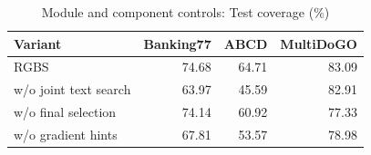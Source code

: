 \begin{table}[!htb]
\caption{Module and component controls: Test coverage (\%)}
\label{tab:rgbs-ablations}
\centering\footnotesize
\setlength{\tabcolsep}{3pt}
\renewcommand{\arraystretch}{1.00}
\begin{tabular*}{\columnwidth}{@{\extracolsep{\fill}}lrrr@{}}
\toprule
Variant & Banking77 & ABCD & MultiDoGO \\
\midrule
RGBS & 74.68 & 64.71 & 83.09 \\
w/o joint text search & 63.97 & 45.59 & 82.91 \\
w/o final selection & 74.14 & 60.92 & 77.33 \\
w/o gradient hints & 67.81 & 53.57 & 78.98 \\
\bottomrule
\end{tabular*}
\end{table}
